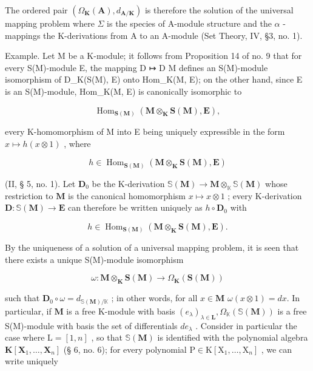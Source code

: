 The ordered pair \((\Omega_{\mathbf{K}}(\mathbf{A}), d_{\mathbf{A}/\mathbf{K}})\) is therefore the solution of the universal mapping problem where \(\Sigma\) is the species of A-module structure and the \(\alpha\) -mappings the K-derivations from A to an A-module (Set Theory, IV, §3, no. 1).

Example. Let M be a K-module; it follows from Proposition 14 of no. 9 that for every S(M)-module E, the mapping D ↦ D \textbar{} M defines an S(M)-module isomorphism of D\_K(S(M), E) onto Hom\_K(M, E); on the other hand, since E is an S(M)-module, Hom\_K(M, E) is canonically isomorphic to

\[
\operatorname{Hom} _ {\mathbf {S} (\mathbf {M})} (\mathbf {M} \otimes_ {\mathbf {K}} \mathbf {S} (\mathbf {M}), \mathbf {E}),
\]

every K-homomorphism of M into E being uniquely expressible in the form \(x \mapsto h(x \otimes 1)\) , where

\[
h \in \operatorname{Hom} _ {\mathbf {S} (\mathbf {M})} (\mathbf {M} \otimes_ {\mathbf {K}} \mathbf {S} (\mathbf {M}), \mathbf {E})
\]

(II, § 5, no. 1). Let \(\mathbf{D}_0\) be the K-derivation \(\mathbb{S}(\mathbf{M}) \to \mathbf{M} \otimes_{\mathbb{K}} \mathbb{S}(\mathbf{M})\) whose restriction to \(\mathbf{M}\) is the canonical homomorphism \(x \mapsto x \otimes 1\) ; every K-derivation \(\mathbf{D}: \mathbb{S}(\mathbf{M}) \to \mathbf{E}\) can therefore be written uniquely as \(h \circ \mathbf{D}_0\) with

\[
h \in \operatorname{Hom} _ {\mathbf {S} (\mathbf {M})} (\mathbf {M} \otimes_ {\mathbf {K}} \mathbf {S} (\mathbf {M}), \mathbf {E}).
\]

By the uniqueness of a solution of a universal mapping problem, it is seen that there exists a unique S(M)-module isomorphism

\[
\omega : \mathbf {M} \otimes_ {\mathbf {K}} \mathbf {S} (\mathbf {M}) \rightarrow \Omega_ {\mathbf {K}} (\mathbf {S} (\mathbf {M}))
\]

such that \(\mathbf{D}_0\circ \omega = d_{\mathbb{S}(\mathbf{M}) / \mathbb{K}}\) ; in other words, for all \(x\in \mathbf{M}\) \(\omega (x\otimes 1) = dx.\) In particular, if \(\mathbf{M}\) is a free K-module with basis \((e_{\lambda})_{\lambda \in \mathbf{L}},\Omega_{\mathbb{K}}(\mathbb{S}(\mathbf{M}))\) is a free S(M)-module with basis the set of differentials \(de_{\lambda}\) . Consider in particular the case where \(\mathrm{L} = [1,n]\) , so that \(\mathbb{S}(\mathbf{M})\) is identified with the polynomial algebra \(\mathbf{K}[\mathbf{X}_1,\dots ,\mathbf{X}_n]\) (§ 6, no. 6); for every polynomial \(\mathrm{P}\in \mathrm{K}[\mathrm{X}_1,\dots ,\mathrm{X}_n]\) , we can write uniquely

